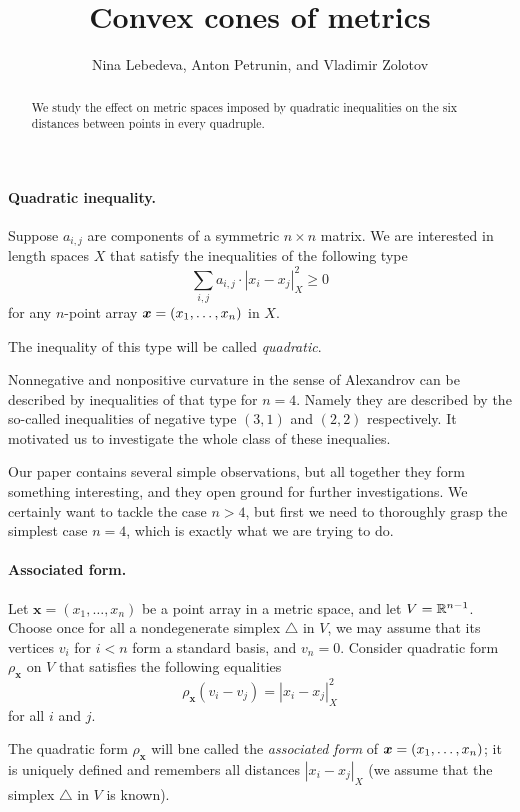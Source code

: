 \documentclass[a4paper,10pt]{article}
\def\thetitle{Convex cones of metrics}
\def\theauthors{Nina Lebedeva, Anton Petrunin, and Vladimir Zolotov}
\begin{document}


\title{\thetitle}
\author{\theauthors}
\date{}
\maketitle

\begin{abstract}
We study the effect on metric spaces imposed by quadratic inequalities on the six distances between points in every quadruple.
\end{abstract}

\paragraph{Quadratic inequality.}\label{par:quadratic-inq}
Suppose $a_{i,j}$ are components of a symmetric $n{\times}n$ matrix.
We are interested in length spaces $X$ that
satisfy the inequalities of the following type
\[\sum_{i,j}a_{i,j}\cdot|x_i-x_j|_X^2\ge 0\]
for any $n$-point array $\bm{x}\z=(x_1,\dots,x_n)$ in $X$.

The inequality of this type will be called \emph{quadratic}.


Nonnegative and nonpositive curvature in the sense of Alexandrov can be described by inequalities of that type for $n=4$.
Namely they are described by the so-called inequalities of negative type $(3,1)$ and $(2,2)$ respectively.
It motivated us to investigate the whole class of these inequalies.

Our paper contains several simple observations, but all together they form something interesting, and they open ground for further investigations.
We certainly want to tackle the case $n>4$, but first we need to thoroughly grasp the simplest case $n=4$, which is exactly what we are trying to do.

\paragraph{Associated form.}\label{Associated form}
Let $\bm{x}=(x_1,\dots,x_n)$ be a point array in a metric space, and let $V\z=\RR^{n-1}$.
Choose once for all a nondegenerate simplex $\triangle$ in $V$,
we may assume that its vertices $v_i$ for $i<n$ form a standard basis, and $v_n=0$.
Consider quadratic form $\rho_{\bm{x}}$ on $V$ that satisfies the following equalities
\[\rho_{\bm{x}}(v_i-v_j)=|x_i-x_j|^2_X\] 
for all $i$ and $j$.

The quadratic form $\rho_{\bm{x}}$ will bne called the \emph{associated form} of $\bm{x}=(x_1,\z\dots,x_n)$;
it is uniquely defined and remembers all distances $|x_i-x_j|_X$
(we assume that the simplex $\triangle$ in $V$ is known).
\end{document}
